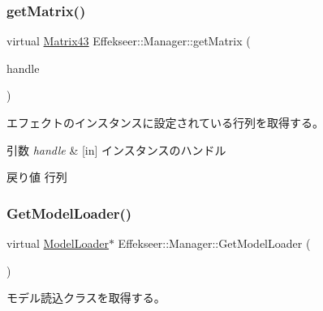 \subsubsection{\texorpdfstring{get\+Matrix()}{getMatrix()}}
{\footnotesize\ttfamily virtual \mbox{\hyperlink{struct_effekseer_1_1_matrix43}{Matrix43}} Effekseer\+::\+Manager\+::get\+Matrix (\begin{DoxyParamCaption}\item[{\mbox{\hyperlink{namespace_effekseer_afba58b8d812da862190e9bbfc040824a}{Handle}}}]{handle }\end{DoxyParamCaption})\hspace{0.3cm}{\ttfamily [pure virtual]}}



エフェクトのインスタンスに設定されている行列を取得する。 


\begin{DoxyParams}{引数}
{\em handle} & \mbox{[}in\mbox{]} インスタンスのハンドル \\
\hline
\end{DoxyParams}
\begin{DoxyReturn}{戻り値}
行列 
\end{DoxyReturn}
\mbox{\label{class_effekseer_1_1_manager_a6afd86fbdfb8b3e6d12c9a80bfb3f80e}} 
\subsubsection{\texorpdfstring{Get\+Model\+Loader()}{GetModelLoader()}}
{\footnotesize\ttfamily virtual \mbox{\hyperlink{class_effekseer_1_1_model_loader}{Model\+Loader}}$\ast$ Effekseer\+::\+Manager\+::\+Get\+Model\+Loader (\begin{DoxyParamCaption}{ }\end{DoxyParamCaption})\hspace{0.3cm}{\ttfamily [pure virtual]}}



モデル読込クラスを取得する。 

\mbox{\label{class_effekseer_1_1_manager_a6ed37b18b9e99ff77f9608da3f4db93a}} 
